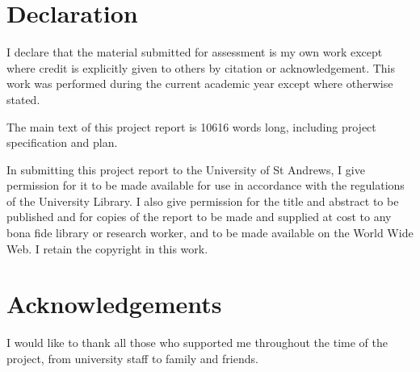 

\section*{Declaration}
I declare that the material submitted for assessment is my own work except where credit is explicitly given to others by citation or acknowledgement. This work was performed during the current academic year except where otherwise stated.
\par \vspace{\baselineskip}
The main text of this project report is 10616 words long, including project specification and plan.
\par \vspace{\baselineskip}
In submitting this project report to the University of St Andrews, I give permission for it to be made available for use in accordance with the regulations of the University Library. I also give permission for the title and abstract to be published and for copies of the report to be made and supplied at cost to any bona fide library or research worker, and to be made available on the World Wide Web. I retain the copyright in this work.

\section*{Acknowledgements}
I would like to thank all those who supported me throughout the time of the project, from university staff to family and friends.